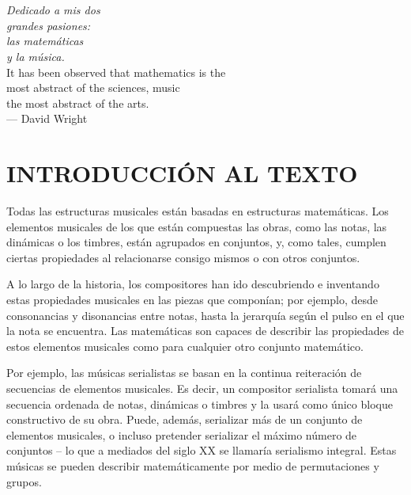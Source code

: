 \chapter*{}
	\begin{flushright}
		\textit{Dedicado a mis dos \\
			grandes pasiones: \\
			las matemáticas \\
			y la música.} \\
		
		\vfill
		It has been observed that mathematics is the\\
		most abstract of the sciences, music\\
		the most abstract of the arts.\\
		\vspace*{0.5cm}
		 --- David Wright \cite{wright}
		 \vspace*{2cm}
	\end{flushright}
	
	
	
	\chapter*{INTRODUCCIÓN AL TEXTO}
	
		Todas las estructuras musicales están basadas en estructuras matemáticas. Los elementos musicales de los que están compuestas las obras, como las notas, las dinámicas o los timbres, están agrupados en conjuntos, y, como tales, cumplen ciertas propiedades al relacionarse consigo mismos o con otros conjuntos.
		
		A lo largo de la historia, los compositores han ido descubriendo e inventando estas propiedades musicales en las piezas que componían; por ejemplo, desde consonancias y disonancias entre notas, hasta la jerarquía según el pulso en el que la nota se encuentra. Las matemáticas son capaces de describir las propiedades de estos elementos musicales como para cualquier otro conjunto matemático.
		
		Por ejemplo, las músicas serialistas se basan en la continua reiteración de secuencias de elementos musicales. Es decir, un compositor serialista tomará una secuencia ordenada de notas, dinámicas o timbres y la usará como único bloque constructivo de su obra. Puede, además, serializar más de un conjunto de elementos musicales, o incluso pretender serializar el máximo número de conjuntos -- lo que a mediados del siglo XX se llamaría serialismo integral. Estas músicas se pueden describir matemáticamente por medio de permutaciones y grupos.
		
